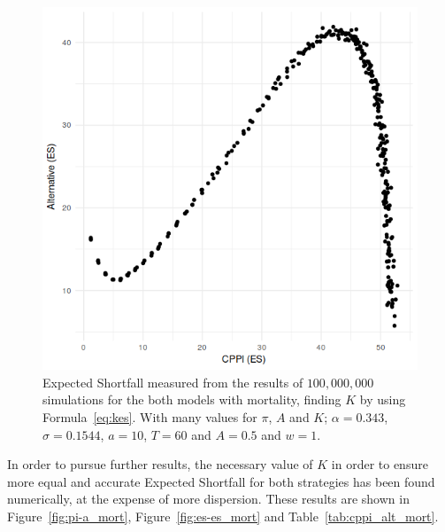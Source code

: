 \begin{figure}[h]
    \centering
    \includegraphics[scale=0.65]{./images/es-es.png}
    \caption{Expected Shortfall measured from the results of $100,000,000$ simulations for the both models with mortality, finding $K$ by using Formula~\ref{eq:kes}. With  many values for $\pi$, $A$ and $K$; $\alpha = 0.343$, $\sigma = 0.1544$, $a = 10$, $T = 60$ and $A = 0.5$ and $w = 1$.}
    \label{fig:es-es_mort_old}
\end{figure}

In order to pursue further results, the necessary value of $K$ in order to ensure more equal and accurate Expected Shortfall for both strategies has been found numerically, at the expense of more dispersion. These results are shown in Figure~\ref{fig:pi-a_mort}, Figure~\ref{fig:es-es_mort} and Table~\ref{tab:cppi_alt_mort}.


